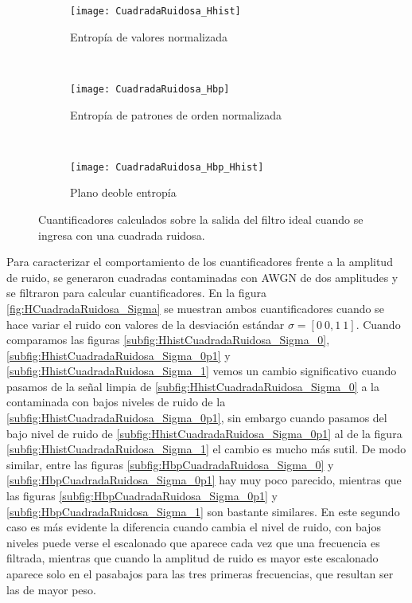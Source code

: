 \begin{figure}[h]
    \centering
    \begin{subfigure}[t]{0.32\textwidth}
        \texttt{[image: CuadradaRuidosa\_Hhist]}
        \caption{Entropía de valores normalizada}
        \label{subfig:CuadradaRuidosa_Hhist}
    \end{subfigure}
    ~ %
    \begin{subfigure}[t]{0.32\textwidth}
        \texttt{[image: CuadradaRuidosa\_Hbp]}
        \caption{Entropía de patrones de orden normalizada}
        \label{subfig:CuadradaRuidosa_Hbp}
    \end{subfigure}
    ~ %
    \begin{subfigure}[t]{0.32\textwidth}
        \texttt{[image: CuadradaRuidosa\_Hbp\_Hhist]}
        \caption{Plano deoble entropía}
        \label{subfig:CuadradaRuidosa_HbpHhist}
    \end{subfigure}
    \caption{Cuantificadores calculados sobre la salida del filtro ideal cuando se ingresa con una cuadrada ruidosa.}\label{fig:CuadradaRuidosa}
\end{figure}

Para caracterizar el comportamiento de los cuantificadores frente a la amplitud de ruido, se generaron cuadradas contaminadas con AWGN de dos amplitudes y se filtraron para calcular cuantificadores.
En la figura \ref{fig:HCuadradaRuidosa_Sigma} se muestran ambos cuantificadores cuando se hace variar el ruido con valores de la desviación estándar $\sigma=[0~0,1~1]$.
Cuando comparamos las figuras \ref{subfig:HhistCuadradaRuidosa_Sigma_0}, \ref{subfig:HhistCuadradaRuidosa_Sigma_0p1} y \ref{subfig:HhistCuadradaRuidosa_Sigma_1} vemos un cambio significativo cuando pasamos de la señal limpia de \ref{subfig:HhistCuadradaRuidosa_Sigma_0} a la contaminada con bajos niveles de ruido de la \ref{subfig:HhistCuadradaRuidosa_Sigma_0p1}, sin embargo cuando pasamos del bajo nivel de ruido de \ref{subfig:HhistCuadradaRuidosa_Sigma_0p1} al de la figura \ref{subfig:HhistCuadradaRuidosa_Sigma_1} el cambio es mucho más sutil.
De modo similar, entre las figuras \ref{subfig:HbpCuadradaRuidosa_Sigma_0} y \ref{subfig:HbpCuadradaRuidosa_Sigma_0p1} hay muy poco parecido, mientras que las figuras \ref{subfig:HbpCuadradaRuidosa_Sigma_0p1} y \ref{subfig:HbpCuadradaRuidosa_Sigma_1} son bastante similares.
En este segundo caso es más evidente la diferencia cuando cambia el nivel de ruido, con bajos niveles puede verse el escalonado que aparece cada vez que una frecuencia es filtrada, mientras que cuando la amplitud de ruido es mayor este escalonado aparece solo en el pasabajos para las tres primeras frecuencias, que resultan ser las de mayor peso.

